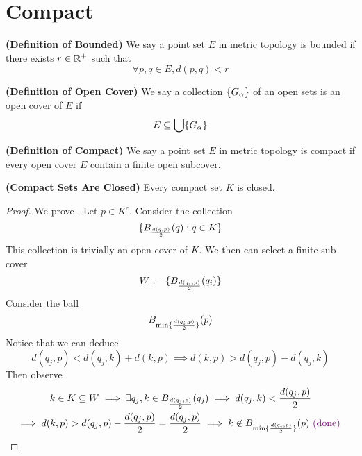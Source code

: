 \documentclass{report}
\begin{document}
\section{Compact}
\begin{definition}
\label{2.8.1}
\textbf{(Definition of Bounded)} We say a point set $E$ in metric topology is bounded if there exists $r\in\mathbb{R}^+$ such that
\begin{equation}
\forall p,q\in E, d(p,q)<r
\end{equation}
\end{definition}
\begin{definition}
\label{2.8.2}
\textbf{(Definition of Open Cover)} We say a collection $\{ G_\alpha   \}$ of an open sets is an open cover of $E$ if 
\begin{equation}
E\subseteq \bigcup \{ G_\alpha  \}
\end{equation}
\end{definition}
\begin{definition}
\label{2.8.3}
\textbf{(Definition of Compact)} We say a point set $E$ in metric topology is compact if every open cover $E$ contain a finite open subcover.
\end{definition}
\begin{theorem}
\label{2.8.4}
\textbf{(Compact Sets Are Closed)} Every compact set $K$ is closed.
\end{theorem}
\begin{proof}
We prove  . Let $p\in K^c$. Consider the collection
\begin{equation}
  \{ B_{\frac{d(q,p)}{2}}(q):q \in K \}
\end{equation}
This collection is trivially an open cover of $K$. We then can select a finite sub-cover
\begin{equation}
W:=\{ B_{\frac{d(q_i,p)}{2}}(q_i) \}
\end{equation}
Consider the ball 
\begin{equation}
B_{\min \{ \frac{d(q_i,p)}{2} \}}(p)
\end{equation}
Notice that we can deduce
\begin{equation}
d(q_j,p)<d(q_j,k)+d(k,p)\implies d(k,p)>d(q_j,p)-d(q_j,k)
\end{equation}
Then observe
\begin{gather}
k\in K\subseteq W\implies \exists q_j, k\in B_{\frac{d(q_j,p)}{2}}(q_j)\implies d(q_j,k)<\frac{d(q_j,p)}{2}\\
\implies d(k,p)>d(q_j,p)-\frac{d(q_j,p)}{2}=\frac{d(q_j,p)}{2}\implies k\not\in B_{\min \{ \frac{d(q_i,p)}{2} \}}(p) \textcolor{violet}{\text{ (done) }}
\end{gather}
\end{proof}
\end{document}
